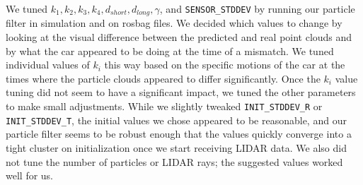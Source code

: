 We tuned $k_1, k_2, k_3, k_4, d_{short}, d_{long}, \gamma$, and \texttt{SENSOR\_STDDEV} by running our particle filter in simulation and on rosbag files. We decided which values to change by looking at the visual difference between the predicted and real point clouds and by what the car appeared to be doing at the time of a mismatch. We tuned individual values of $k_i$ this way based on the specific motions of the car at the times where the particle clouds appeared to differ significantly. Once the $k_i$ value tuning did not seem to have a significant impact, we tuned the other parameters to make small adjustments. While we slightly tweaked \texttt{INIT\_STDDEV\_R} or \texttt{INIT\_STDDEV\_T}, the initial values we chose appeared to be reasonable, and our particle filter seems to be robust enough that the values quickly converge into a tight cluster on initialization once we start receiving LIDAR data. We also did not tune the number of particles or LIDAR rays; the suggested values worked well for us.
